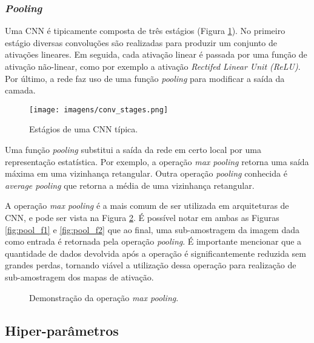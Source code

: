\documentclass[
12pt,				%
openright,			%
oneside,			%
a4paper,			%
english,			%
french,				%
spanish,			%
brazil				%
]{abntex2}
\begin{document}
\subsubsection{\textit{Pooling}} \label{pooling}

Uma CNN é tipicamente composta de três estágios (Figura \ref{fig:conv_stages}). No primeiro estágio diversas convoluções são realizadas para produzir um conjunto de ativações lineares. Em seguida, cada ativação linear é passada por uma função de ativação não-linear, como por exemplo a ativação \textit{Rectifed Linear Unit (ReLU)}. Por último, a rede faz uso de uma função \textit{pooling} para modificar a saída da camada.

\begin{figure}[ht]
\centering
\caption{Estágios de uma CNN típica.}
\texttt{[image: imagens/conv\_stages.png]}
\label{fig:conv_stages}
\end{figure}

Uma função \textit{pooling} substitui a saída da rede em certo local por uma representação estatística. Por exemplo, a operação \textit{max pooling} \cite{Zhou-et-al-1988} retorna uma saída máxima em uma vizinhança retangular. Outra operação \textit{pooling} conhecida é \textit{average pooling} que retorna a média de uma vizinhança retangular.

A operação \textit{max pooling} é a mais comum de ser utilizada em arquiteturas de CNN, e pode ser vista na Figura \ref{fig:pool_operation}. É possível notar em ambas as Figuras \ref{fig:pool_f1} e \ref{fig:pool_f2} que ao final, uma sub-amostragem da imagem dada como entrada é retornada pela operação \textit{pooling}. É importante mencionar que a quantidade de dados devolvida após a operação é significantemente reduzida sem grandes perdas, tornando viável a utilização dessa operação para realização de sub-amostragem dos mapas de ativação.

\begin{figure}[ht]
\centering
\caption{Demonstração da operação \textit{max pooling}.}
\hfill
{}
\label{fig:pool_operation}
\end{figure}

\subsection{Hiper-parâmetros} \label{hiperparametros}
\end{document}
